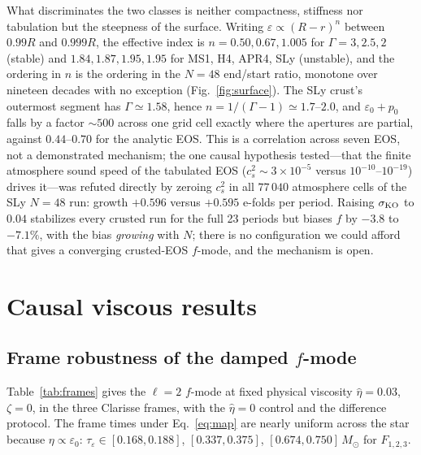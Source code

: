 \documentclass[aps,prd,reprint,amsmath,amssymb,nofootinbib,longbibliography,superscriptaddress]{revtex4-2}
\newcommand{\Msun}{M_\odot}
\newcommand{\cs}{c_s}
\newcommand{\KO}{\sigma_{\rm KO}}
\begin{document}
What discriminates the two classes is neither compactness, stiffness nor tabulation but the
steepness of the surface. Writing $\varepsilon\propto(R-r)^n$ between $0.99R$ and $0.999R$, the
effective index is $n = 0.50, 0.67, 1.005$ for $\Gamma = 3, 2.5, 2$ (stable) and
$1.84, 1.87, 1.95, 1.95$ for MS1, H4, APR4, SLy (unstable), and the ordering in $n$ is the ordering
in the $N=48$ end/start ratio, monotone over nineteen decades with no exception
(Fig.~\ref{fig:surface}). The SLy crust's
outermost segment has $\Gamma\simeq1.58$, hence $n = 1/(\Gamma-1)\simeq1.7$--$2.0$, and
$\varepsilon_0+p_0$ falls by a factor $\sim500$ across one grid cell exactly where the apertures
are partial, against $0.44$--$0.70$ for the analytic EOS. This is a correlation across seven EOS,
not a demonstrated mechanism; the one causal hypothesis tested---that the finite atmosphere
sound speed of the tabulated EOS ($\cs^2\sim3\times10^{-5}$ versus $10^{-10}$--$10^{-19}$) drives
it---was refuted directly by zeroing $\cs^2$ in all $77\,040$ atmosphere cells of the SLy
$N=48$ run: growth $+0.596$ versus $+0.595$ e-folds per period. Raising $\KO$ to $0.04$
stabilizes every crusted run for the full 23 periods but biases $f$ by $-3.8$ to $-7.1\%$, with the
bias \emph{growing} with $N$; there is no configuration we could afford that gives a converging
crusted-EOS $f$-mode, and the mechanism is open.

\section{Causal viscous results}
\label{sec:bdnk}

\subsection{Frame robustness of the damped $f$-mode}
Table~\ref{tab:frames} gives the $\ell=2$ $f$-mode at fixed physical viscosity $\hat\eta=0.03$,
$\zeta=0$, in the three Clarisse frames, with the $\hat\eta=0$ control and the difference
protocol. The frame times under Eq.~\eqref{eq:map} are nearly uniform across the star because
$\eta\propto\varepsilon_0$: $\tau_\varepsilon\in[0.168,0.188]$, $[0.337,0.375]$, $[0.674,0.750]\,\Msun$
for $F_{1,2,3}$.
\end{document}

